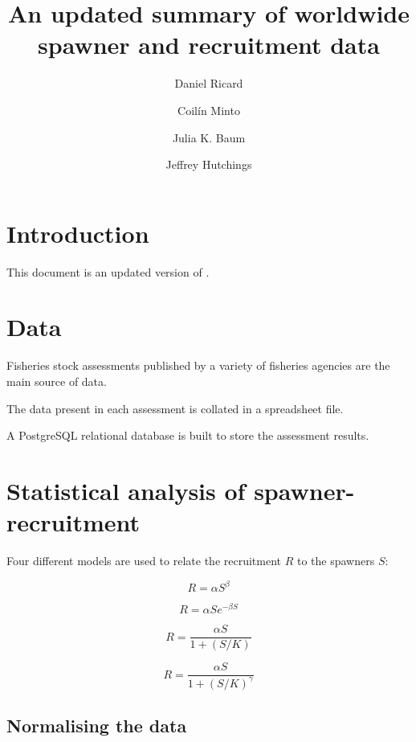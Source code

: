 \documentclass[a4paper,10pt]{article}
\title{An updated summary of worldwide spawner and recruitment data}
\author{Daniel Ricard \and Coil\'{i}n Minto \and Julia K. Baum \and Jeffrey Hutchings}
\begin{document}
\maketitle
\tableofcontents

\begin{abstract}

\end{abstract}

\section{Introduction}

This document is an updated version of \cite{Myers:etal:1995a}. 

\section{Data}

Fisheries stock assessments published by a variety of fisheries agencies are the main source of data. 

The data present in each assessment is collated in a spreadsheet file.

A PostgreSQL relational database is built to store the assessment results.



\section{Statistical analysis of spawner-recruitment}

Four different models are used to relate the recruitment $R$ to the spawners $S$:

\begin{equation}\label{eq:power}
 R = \alpha S^{\beta}
\end{equation} 

\begin{equation}\label{eq:ricker}
 R = \alpha S e^{-\beta S}
\end{equation} 

\begin{equation}\label{eq:BH}
 R = \frac{\alpha S}{1 + \left(S / K \right)}
\end{equation} 

\begin{equation}\label{eq:shepherd}
 R = \frac{\alpha S}{1 + \left(S / K \right)^{\gamma}}
\end{equation} 

\subsection{Normalising the data}
\end{document}

